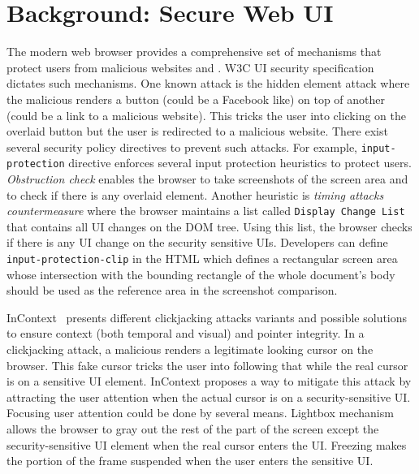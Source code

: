 \section{Background: Secure Web UI}
\label{sec:background}

The modern web browser provides a comprehensive set of mechanisms that protect users from malicious websites and \js. W3C UI security specification~\cite{w3c_spec} dictates such mechanisms. One known attack is the hidden element attack where the malicious \js renders a button (could be a Facebook like) on top of another (could be a link to a malicious website). This tricks the user into clicking on the overlaid button but the user is redirected to a malicious website. There exist several security policy directives to prevent such attacks. For example, \texttt{input-protection} directive enforces several input protection heuristics to protect users. \emph{Obstruction check} enables the browser to take screenshots of the screen area and to check if there is any overlaid element. Another heuristic is \emph{timing attacks countermeasure} where the browser maintains a list called \texttt{Display Change List} that contains all UI changes on the DOM tree. Using this list, the browser checks if there is any UI change on the security sensitive UIs. Developers can define \texttt{input-protection-clip} in the HTML which defines a rectangular screen area whose intersection with the bounding rectangle of the whole document's body should be used as the reference area in the screenshot comparison.

InContext~\cite{huang2012clickjacking} presents different clickjacking attacks variants and possible solutions to ensure context (both temporal and visual) and pointer integrity. In a clickjacking attack, a malicious \js renders a legitimate looking cursor on the browser. This fake cursor tricks the user into following that while the real cursor is on a sensitive UI element. InContext proposes a way to mitigate this attack by attracting the user attention when the actual cursor is on a security-sensitive UI. Focusing user attention could be done by several means. Lightbox mechanism allows the browser to gray out the rest of the part of the screen except the security-sensitive UI element when the real cursor enters the UI. Freezing makes the portion of the frame suspended when the user enters the sensitive UI. %